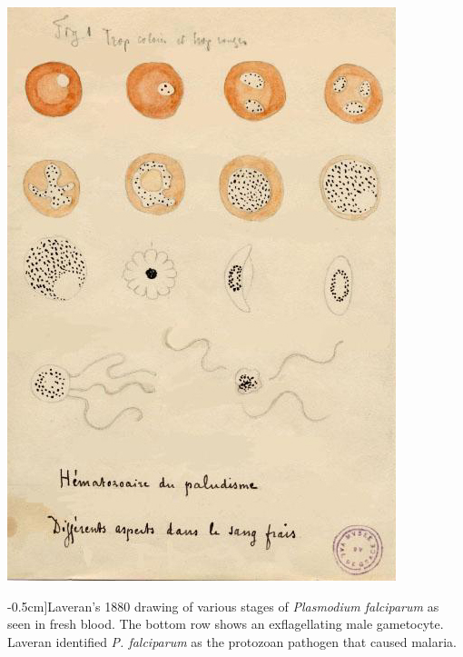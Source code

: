 \begin{marginfigure}
\begin{center}
\includegraphics[width=\textwidth]{illustration_images/hitchhiking/malaria/Laveran_Malaria_drawings.jpg}
\end{center}
\caption[][-0.5cm]{Laveran's 1880 drawing of various stages of {\it Plasmodium
    falciparum} as seen in fresh blood. The bottom row shows an
  exflagellating male gametocyte. Laveran identified {\it P. falciparum} as the
  protozoan pathogen that caused malaria. } \label{fig:malaria}
\end{marginfigure}

